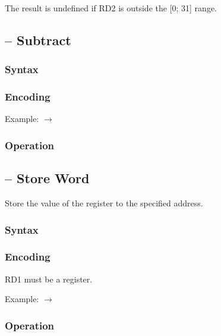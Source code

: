 \documentclass[a4paper,12pt,twoside,extrafontsizes]{memoir}
\begin{document}
{

The result is undefined if RD2 is outside the [0; 31] range.

\subsection{ -- Subtract}
\label{subsec:instr:sub}

\subsubsection{Syntax}


\subsubsection{Encoding}


Example:  $\rightarrow$ 

\subsubsection{Operation}


\subsection{ -- Store Word}
\label{subsec:instr:sw}

Store the value of the register to the specified address.

\subsubsection{Syntax}


\subsubsection{Encoding}


RD1 must be a register.

Example:  $\rightarrow$ 

\subsubsection{Operation}

}
\end{document}
